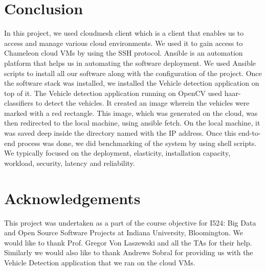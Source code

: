 \documentclass[9pt,twocolumn,twoside]{../../styles/osajnl}
\begin{document}
\section{Conclusion}
In this project, we used cloudmesh client which is a client that
enables us to access and manage various cloud environments.  We used
it to gain access to Chameleon cloud VMs by using the SSH protocol.
Ansible is an automation platform that helps us in automating the
software deployment.  We used Ansible scripts to install all our
software along with the configuration of the project.  Once the
software stack was installed, we installed the Vehicle detection
application on top of it.  The Vehicle detection application running
on OpenCV used haar-classifiers to detect the vehicles.  It created an image wherein the vehicles were marked with a red rectangle.  This image, which was generated on the cloud, was then redirected to the local machine, using ansible fetch.  On the local machine, it was saved deep inside the directory named with the IP address.  Once this end-to-end process was
done, we did benchmarking of the system by using shell scripts.  We typically focused on the
deployment, elasticity, installation capacity, workload, security,
latency and reliability.

\section{Acknowledgements}
This project was undertaken as a part of the course objective for
I524: Big Data and Open Source Software Projects at Indiana
University, Bloomington.  We would like to thank Prof. Gregor Von
Laszewski and all the TAs for their help.  Similarly we would also
like to thank Andrews Sobral for providing us with the Vehicle
Detection application that we ran on the cloud VMs.


\end{document}
